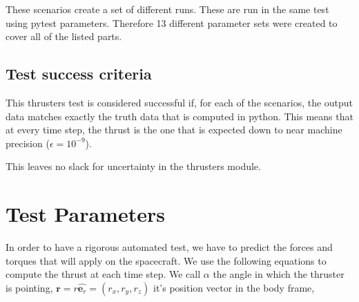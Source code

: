 These scenarios create a set of different runs. These are run in the same test using pytest parameters. Therefore 13 different parameter sets were created to cover all of the listed parts.

\subsection{Test success criteria}

This thrusters test is considered successful if, for each of the scenarios, the output data matches exactly the truth data that is computed in python. This means that at every time step, the thrust is the one that is expected down to near machine precision ($\epsilon = 10^{-9}$). 

This leaves no slack for uncertainty in the thrusters module.



\section{Test Parameters}


In order to have a rigorous automated test, we have to predict the forces and torques that will apply on the spacecraft. We use the following equations to compute the thrust at each time step. We call $\alpha$ the angle in which the thruster is pointing, $\bm r = r \hat{\bm e_r}= \left(r_x, r_y, r_z \right)$ it's position vector in the body frame, 

